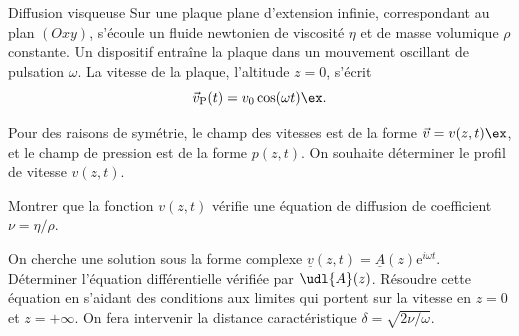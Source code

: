 \begin{exo}[PC][3][colle]{Diffusion visqueuse}
  Sur une plaque plane d'extension infinie, correspondant au plan $(Oxy)$, s’écoule un fluide newtonien de viscosité $\eta$ et de masse volumique $\rho$ constante. Un dispositif entraîne la plaque dans un mouvement oscillant de pulsation $\omega$. La vitesse de la plaque, l’altitude $z=0$, s'écrit
  \begin{equation}
    \Vec{v}_{\mathrm{P}}(t)=v_0 \cos (\omega t) \ex.
  \end{equation}
  
  Pour des raisons de symétrie, le champ des vitesses est de la forme $\Vec{v}=v(z, t) \ex$, et le champ de pression est de la forme $p(z,t)$. On souhaite déterminer le profil de vitesse $v(z,t)$.
  \begin{quest}
    \item Montrer que la fonction $v(z, t)$ vérifie une équation de diffusion de coefficient $\nu=\eta / \rho$.
    \item On cherche une solution sous la forme complexe $\underline{v}(z,t)=\underline{A}(z) \mathrm{e}^{i \omega t}$. Déterminer l'équation différentielle vérifiée par $\udl{A}(z)$. Résoudre cette équation en s'aidant 
    des conditions aux limites qui portent sur la vitesse en $z=0$ et $z=+\infty$. On fera intervenir la distance caractéristique $\delta=\sqrt{2 \nu / \omega}$.
  \end{quest}
\end{exo}

